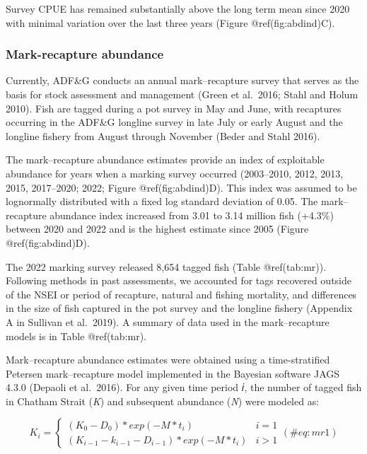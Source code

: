 \documentclass[
]{article}
\begin{document}
Survey CPUE has remained substantially above the long term mean since
2020 with minimal variation over the last three years (Figure
@ref(fig:abdind)C).

\hypertarget{mark-recapture-abundance}{%
\subsubsection{Mark-recapture
abundance}\label{mark-recapture-abundance}}

Currently, ADF\&G conducts an annual mark--recapture survey that serves
as the basis for stock assessment and management (Green et al.~2016;
Stahl and Holum 2010). Fish are tagged during a pot survey in May and
June, with recaptures occurring in the ADF\&G longline survey in late
July or early August and the longline fishery from August through
November (Beder and Stahl 2016).

The mark--recapture abundance estimates provide an index of exploitable
abundance for years when a marking survey occurred (2003--2010, 2012,
2013, 2015, 2017--2020; 2022; Figure @ref(fig:abdind)D). This index was
assumed to be lognormally distributed with a fixed log standard
deviation of 0.05. The mark--recapture abundance index increased from
3.01 to 3.14 million fish (+4.3\%) between 2020 and 2022 and is the
highest estimate since 2005 (Figure @ref(fig:abdind)D).

The 2022 marking survey released 8,654 tagged fish (Table @ref(tab:mr)).
Following methods in past assessments, we accounted for tags recovered
outside of the NSEI or period of recapture, natural and fishing
mortality, and differences in the size of fish captured in the pot
survey and the longline fishery (Appendix A in Sullivan et al.~2019). A
summary of data used in the mark--recapture models is in Table
@ref(tab:mr).

Mark--recapture abundance estimates were obtained using a
time-stratified Petersen mark--recapture model implemented in the
Bayesian software JAGS 4.3.0 (Depaoli et al.~2016). For any given time
period 𝑖, the number of tagged fish in Chatham Strait (\emph{K}) and
subsequent abundance (\emph{N}) were modeled as:

\[
\begin{equation}
K_{i} = \left\{ \begin{array}{ll}
(K_0 - D_0)*exp(-M*t_i) &i = 1\\
(K_{i-1} - k_{i-1} - D_{i-1})*exp(-M*t_i) & i > 1
\end{array}\right.
(\#eq:mr1)
\end{equation}
\]
\end{document}
